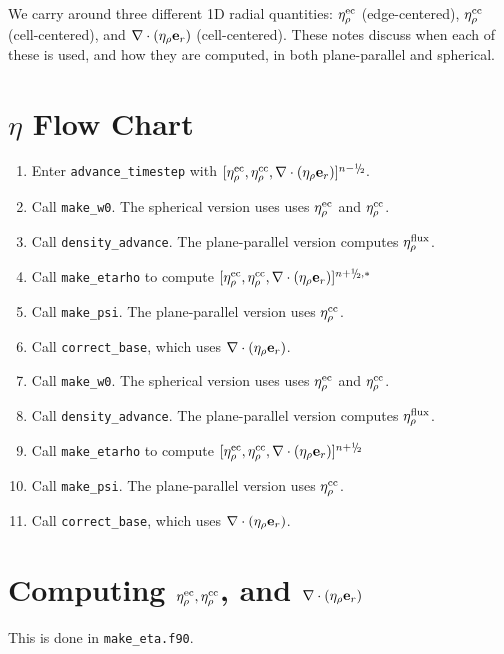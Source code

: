 We carry around three different 1D radial quantities: $\eta_{\rho}^{\rm ec}$
(edge-centered), $\eta_{\rho}^{\rm cc}$ (cell-centered), and $\nabla\cdot(\eta_{\rho}{\bf e}_r)$
(cell-centered).  These notes discuss when each of these is used, and
how they are computed, in both plane-parallel and spherical.

\section{$\eta$ Flow Chart}
\begin{enumerate}
\item Enter {\tt advance\_timestep} with $[\etarhoec, \etarhocc, \divetarho]^{n-\myhalf}$.
\item Call {\tt make\_w0}.  The spherical version uses uses $\eta_{\rho}^{\rm ec}$ and $\eta_{\rho}^{\rm cc}$.
\item Call {\tt density\_advance}.  The plane-parallel version computes $\eta_{\rho}^{\rm flux}$.
\item Call {\tt make\_etarho} to compute $[\etarhoec, \etarhocc, \divetarho]^{n+\myhalf,*}$
\item Call {\tt make\_psi}.  The plane-parallel version uses $\eta_{\rho}^{\rm cc}$.
\item Call {\tt correct\_base}, which uses $\nabla\cdot(\eta_{\rho}{\bf e}_r)$.
\item Call {\tt make\_w0}.  The spherical version uses uses $\eta_{\rho}^{\rm ec}$ and $\eta_{\rho}^{\rm cc}$.
\item Call {\tt density\_advance}.  The plane-parallel version computes $\eta_{\rho}^{\rm flux}$.
\item Call {\tt make\_etarho} to compute $[\etarhoec, \etarhocc, \divetarho]^{n+\myhalf}$
\item Call {\tt make\_psi}.  The plane-parallel version uses $\eta_{\rho}^{\rm cc}$.
\item Call {\tt correct\_base}, which uses $\nabla\cdot(\eta_{\rho}{\bf e}_r)$.
\end{enumerate}

\section{Computing $\eta_{\rho}^{\rm ec}, \eta_{\rho}^{\rm cc}$, and $\nabla\cdot(\eta_{\rho}{\bf e}_r)$}
This is done in {\tt make\_eta.f90}.

